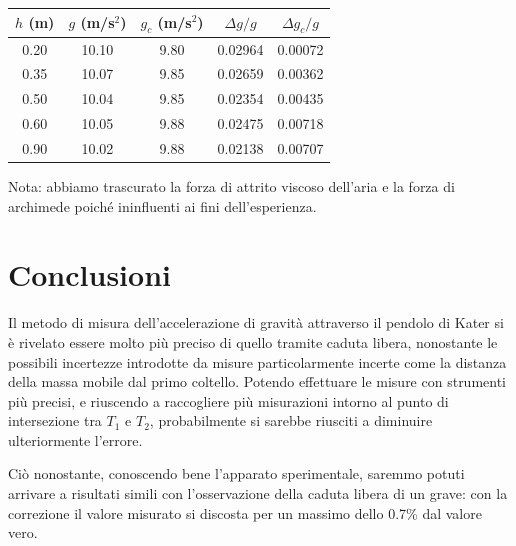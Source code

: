 \begin{center}
\begin{tabular}{c|c|c|c|c}
$h$ (m) & $g$ (m/s$^2$) & $g_c$ (m/s$^2$) & $\Delta g/g$ & $\Delta g_c/g$\\
\midrule
0.20 & 10.10 & 9.80 & 0.02964 & 0.00072 \\
0.35 & 10.07 & 9.85 & 0.02659 & 0.00362 \\
0.50 & 10.04 & 9.85 & 0.02354 & 0.00435 \\
0.60 & 10.05 & 9.88 & 0.02475 & 0.00718 \\
0.90 & 10.02 & 9.88 & 0.02138 & 0.00707 \\
\end{tabular}
\end{center}

Nota: abbiamo trascurato la forza di attrito viscoso dell'aria e la forza di archimede poiché ininfluenti ai fini dell'esperienza.

\section{Conclusioni}

Il metodo di misura dell'accelerazione di gravità attraverso il pendolo di Kater si è rivelato essere molto più preciso di quello tramite caduta libera, nonostante le possibili incertezze introdotte da misure particolarmente incerte come la distanza della massa mobile dal primo coltello. Potendo effettuare le misure con strumenti più precisi, e riuscendo a raccogliere più misurazioni intorno al punto di intersezione tra $T_1$ e $T_2$, probabilmente si sarebbe riusciti a diminuire ulteriormente l'errore. 

Ciò nonostante, conoscendo bene l'apparato sperimentale, saremmo potuti arrivare a risultati simili con l'osservazione della caduta libera di un grave: con la correzione il valore misurato si discosta per un massimo dello 0.7\% dal valore vero.


